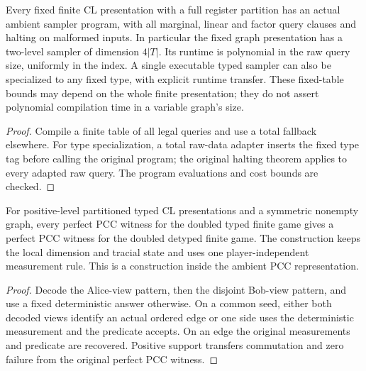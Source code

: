 \begin{lemma}
\label{lem:fixed-cl-sampler}
\leanok
Every fixed finite CL presentation with a full register partition has an actual
ambient sampler program, with all marginal, linear and factor query clauses and
halting on malformed inputs. In particular the fixed graph presentation has a
two-level sampler of dimension $4|T|$. Its runtime is polynomial in the raw query
size, uniformly in the index. A single executable typed sampler can also be
specialized to any fixed type, with explicit runtime transfer.
These fixed-table bounds may depend on the whole finite presentation; they do
not assert polynomial compilation time in a variable graph's size.
\end{lemma}
\begin{proof}
\leanok
Compile a finite table of all legal queries and use a total fallback elsewhere.
For type specialization, a total raw-data adapter inserts the fixed type tag
before calling the original program; the original halting theorem applies to
every adapted raw query. The program evaluations and cost bounds are checked.
\end{proof}

\begin{lemma}
\label{lem:detype-game-completeness}
\leanok
For positive-level partitioned typed CL presentations and a symmetric nonempty
graph, every perfect PCC witness for the doubled typed finite game gives a
perfect PCC witness for the doubled detyped finite game. The construction keeps
the local dimension and tracial state and uses one player-independent measurement
rule. This is a construction inside the ambient PCC representation.
\end{lemma}
\begin{proof}
\leanok
Decode the Alice-view pattern, then the disjoint Bob-view pattern, and use a
fixed deterministic answer otherwise. On a common seed, either both decoded
views identify an actual ordered edge or one side uses the deterministic
measurement and the predicate accepts. On an edge the original measurements
and predicate are recovered. Positive support transfers commutation and zero
failure from the original perfect PCC witness.
\end{proof}

